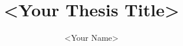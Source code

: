 \documentclass[english,nohyphen]{GayaUKM}
\title{<Your Thesis Title>}
\author{<Your Name>}
\begin{document}
\maketitle

\frontmatter
\declaration








\tableofcontents
\listoffigures
\listoftables




\mainmatter








\appendix


\end{document}
